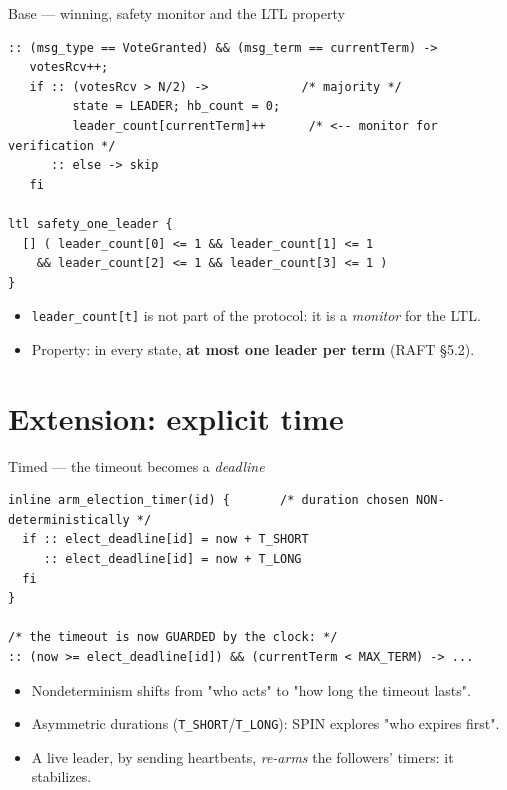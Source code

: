 \documentclass{beamer}
\begin{document}
\begin{frame}[fragile]{Base — winning, safety monitor and the LTL property}
\begin{lstlisting}[style=promela]
:: (msg_type == VoteGranted) && (msg_term == currentTerm) ->
   votesRcv++;
   if :: (votesRcv > N/2) ->             /* majority */
         state = LEADER; hb_count = 0;
         leader_count[currentTerm]++      /* <-- monitor for verification */
      :: else -> skip
   fi

ltl safety_one_leader {
  [] ( leader_count[0] <= 1 && leader_count[1] <= 1
    && leader_count[2] <= 1 && leader_count[3] <= 1 )
}
\end{lstlisting}
  \begin{itemize}
    \item \texttt{leader\_count[t]} is not part of the protocol: it is a \emph{monitor} for the LTL.
    \item Property: in every state, \textbf{at most one leader per term} (RAFT §5.2).
  \end{itemize}
\end{frame}

\section{Extension: explicit time}

\begin{frame}[fragile]{Timed — the timeout becomes a \emph{deadline}}
\begin{lstlisting}[style=promela]
inline arm_election_timer(id) {       /* duration chosen NON-deterministically */
  if :: elect_deadline[id] = now + T_SHORT
     :: elect_deadline[id] = now + T_LONG
  fi
}

/* the timeout is now GUARDED by the clock: */
:: (now >= elect_deadline[id]) && (currentTerm < MAX_TERM) -> ...
\end{lstlisting}
  \begin{itemize}
    \item Nondeterminism shifts from "who acts" to "how long the timeout lasts".
    \item Asymmetric durations (\texttt{T\_SHORT}/\texttt{T\_LONG}): SPIN explores "who expires first".
    \item A live leader, by sending heartbeats, \emph{re-arms} the followers' timers: it stabilizes.
  \end{itemize}
\end{frame}
\end{document}
